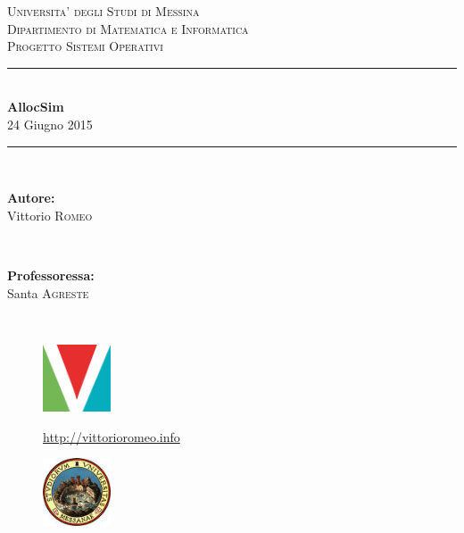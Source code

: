 \documentclass[12pt]{report}
\newcommand{\HRule}{\rule{\linewidth}{0.5mm}}
\renewcommand\emph{\textbf}
\begin{document}
    \begin{titlepage}

        \center

        \textsc{\LARGE Universita' degli Studi di Messina}\\[0.1cm]
        \textsc{\Large Dipartimento di Matematica e Informatica}\\[0.5cm]
        \textsc{\Large Progetto Sistemi Operativi}\\[0.5cm]

        \HRule \\[0.4cm]
        { \huge \bfseries AllocSim}\\[0.1cm]

        {\large 24 Giugno 2015}
        \HRule \\[1.5cm]

        \begin{minipage}{0.4\textwidth}
        \begin{flushleft} \large
        \emph{Autore:}\\
        Vittorio \textsc{Romeo}
        \end{flushleft}
        \end{minipage}
        ~
        \begin{minipage}{0.4\textwidth}
        \begin{flushright} \large
        \emph{Professoressa:} \\
        Santa \textsc{Agreste}

        \end{flushright}
        \end{minipage}\\[4cm]

        \vfill

        \begin{minipage}{\linewidth}
            \centering
            \begin{minipage}{0.35\linewidth}
                \begin{figure}[H]
                    \center
                    \includegraphics[width=2cm, height=2cm]{logovee}

                    \url{http://vittorioromeo.info}
                \end{figure}
            \end{minipage}
            \hspace{0.27\linewidth}
            \begin{minipage}{0.35\linewidth}
                \begin{figure}[H]
                    \center
                    \includegraphics[width=2cm, height=2cm]{logounime}


\end{figure}
\end{minipage}
\end{minipage}
\end{titlepage}
\end{document}

